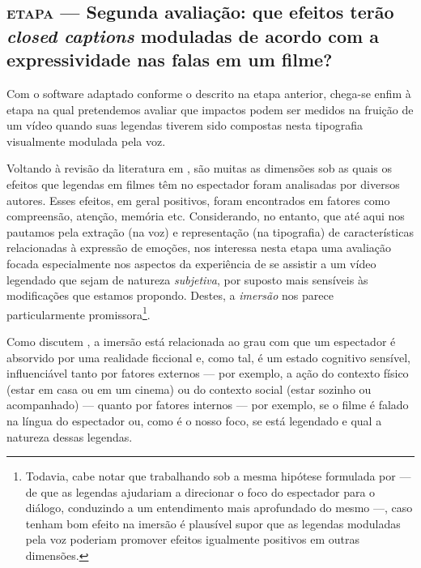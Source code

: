 \documentclass[a4paper,11pt,titlepage,singlespacing]{article}
\newcommand{\etapa}[1]{\textsc{etapa \oldstylenums{#1}}}
\begin{document}

\subsection{\etapa{4} — Segunda avaliação: que efeitos terão \textit{closed captions} moduladas de acordo com a expressividade nas falas em um filme?}
\label{subsec:avaliacao2}

Com o software adaptado conforme o descrito na etapa anterior, chega-se enfim à etapa na qual pretendemos avaliar que impactos podem ser medidos na fruição de um vídeo quando suas legendas tiverem sido compostas nesta tipografia visualmente modulada pela voz. 

Voltando à revisão da literatura em , são muitas as dimensões sob as quais os efeitos que legendas em filmes têm no espectador foram analisadas por diversos autores. Esses efeitos, em geral positivos, foram encontrados em fatores como compreensão, atenção, memória etc. Considerando, no entanto, que até aqui nos pautamos pela extração (na voz) e representação (na tipografia) de características relacionadas à expressão de emoções, nos interessa nesta etapa uma avaliação focada especialmente nos aspectos da experiência de se assistir a um vídeo legendado que sejam de natureza \textit{subjetiva}, por suposto mais sensíveis às modificações que estamos propondo. Destes, a \textit{imersão} nos parece particularmente promissora\footnote{Todavia, cabe notar que trabalhando sob a mesma hipótese formulada por  — de que as legendas ajudariam a direcionar o foco do espectador para o diálogo, conduzindo a um entendimento mais aprofundado do mesmo —, caso tenham bom efeito na imersão é plausível supor que as legendas moduladas pela voz poderiam promover efeitos igualmente positivos em outras dimensões.}.

Como discutem , a imersão está relacionada ao grau com que um espectador é absorvido por uma realidade ficcional e, como tal, é um estado cognitivo sensível, influenciável tanto por fatores externos — por exemplo, a ação do contexto físico (estar em casa ou em um cinema) ou do contexto social (estar sozinho ou acompanhado) — quanto por fatores internos — por exemplo, se o filme é falado na língua do espectador ou, como é o nosso foco, se está legendado e qual a natureza dessas legendas.
\end{document}
